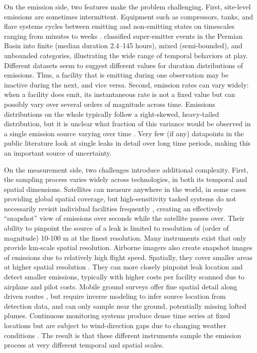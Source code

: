 \documentclass[unnumsec,webpdf,modern,mediumone]{oup-authoring-template}
\begin{document}

On the emission side, two features make the problem challenging. First, site-level emissions are sometimes intermittent. Equipment such as compressors, tanks, and flare systems cycles between emitting and non-emitting states on timescales ranging from minutes to weeks \citep{Cusworth2021, Daniels2024}. \citet{Cusworth2026NatComms} classified super-emitter events in the Permian Basin into finite (median duration 2.4--145 hours), mixed (semi-bounded), and unbounded categories, illustrating the wide range of temporal behaviors at play. Different datasets seem to suggest different values for duration distributions of emissions. Thus, a facility that is emitting during one observation may be inactive during the next, and vice versa. Second, emission rates can vary widely: when a facility does emit, its instantaneous rate is not a fixed value but can possibly vary over several orders of magnitude across time. Emissions distributions on the whole typically follow a right-skewed, heavy-tailed distribution, but it is unclear what fraction of this variance would be observed in a single emission source varying over time \citep{Brandt2014, ZavalaAraiza2015, Brandt2016, Duren2019}. Very few (if any) datapoints in the public literature look at single leaks in detail over long time periods, making this an important source of uncertainty.


On the measurement side, two challenges introduce additional complexity. First, the sampling process varies widely across technologies, in both its temporal and spatial dimensions. Satellites can measure anywhere in the world, in some cases providing global spatial coverage, but high-sensitivity tasked systems do not necessarily revisit individual facilities frequently \citep{Jacob2022, Jervis2025Science}, creating an effectively ``snapshot'' view of emissions over seconds while the satellite passes over. Their ability to pinpoint the source of a leak is limited to resolution of (order of magnitude) 10-100 m at the finest resolution. Many instruments exist that only provide km-scale spatial resolution. Airborne imagers also create snapshot images of emissions due to relatively high flight speed. Spatially, they cover smaller areas at higher spatial resolution \citep{Cusworth2026NatComms, Sherwin2024Nature}. They can more closely pinpoint leak location and detect smaller emissions, typically with higher costs per facility scanned due to airplane and pilot costs. Mobile ground surveys offer fine spatial detail along driven routes \citep{Omara2018}, but require inverse modeling to infer source location from detection data, and can only sample near the ground, potentially missing lofted plumes. Continuous monitoring systems produce dense time series at fixed locations but are subject to wind-direction gaps due to changing weather conditions \citep{Daniels2024}. The result is that these different instruments sample the emission process at very different temporal and spatial scales. 
\end{document}
